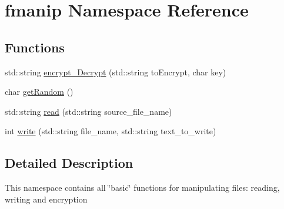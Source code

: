 \hypertarget{namespacefmanip}{\section{fmanip Namespace Reference}
\label{namespacefmanip}
}
\subsection*{Functions}
\begin{DoxyCompactItemize}
\item 
std\+::string \hyperlink{namespacefmanip_a0b2be66ee15d11cf7c2223ca2748bc48}{encrypt\+\_\+\+Decrypt} (std\+::string to\+Encrypt, char key)
\item 
char \hyperlink{namespacefmanip_ac6ece97ebf07da66f8750fd836b29587}{get\+Random} ()
\item 
std\+::string \hyperlink{namespacefmanip_a66b745d158684878cd4c8bc815c74849}{read} (std\+::string source\+\_\+file\+\_\+name)
\item 
int \hyperlink{namespacefmanip_af5012379267d8164747803e2ecaa1205}{write} (std\+::string file\+\_\+name, std\+::string text\+\_\+to\+\_\+write)
\end{DoxyCompactItemize}


\subsection{Detailed Description}
This namespace contains all \char`\"{}basic\char`\"{} functions for manipulating files\+: reading, writing and encryption 

